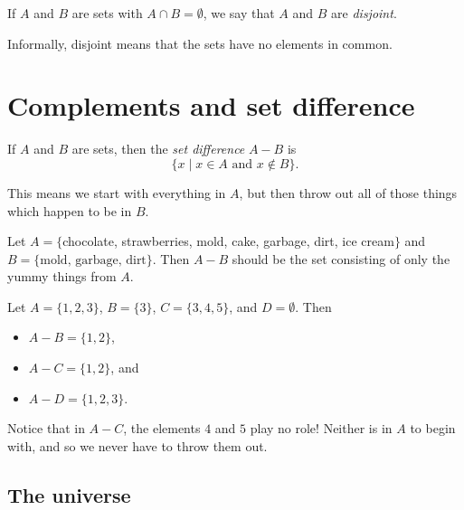 \documentclass{tufte-book}
\begin{document}
\begin{definition}
  If $A$ and $B$ are sets with $A \cap B = \emptyset$, we say that $A$ and $B$ are \emph{disjoint}.
\end{definition}
Informally, disjoint means that the sets have no elements in common.




\section{Complements and set difference}
\label{sec:compl-set-diff}

\begin{definition}
  If $A$ and $B$ are sets, then the \emph{set difference} $A - B$ is 
  \[
  \{x \mid x \in A \text{ and } x \notin B\}.
  \]
\end{definition}
This means we start with everything in $A$, but then throw out all of those things which happen to be in $B$.

\begin{example}
  Let $A = \{$chocolate, strawberries, mold, cake, garbage, dirt, ice cream$\}$ and $B = \{\text{mold, garbage, dirt}\}$. Then $A - B$ should be the set consisting of only the yummy things from $A$.
\end{example}

\begin{example}
  Let $A = \{1, 2, 3\}$, $B = \{3\}$, $C = \{3, 4, 5\}$, and $D = \emptyset$. Then
  \begin{itemize}
      \item $A - B = \{1, 2\}$,
      \item $A - C = \{1, 2\}$, and
      \item $A - D = \{1, 2, 3\}$.
  \end{itemize}
  Notice that in $A - C$, the elements $4$ and $5$ play no role! Neither is in $A$ to begin with, and so we never have to throw them out.
\end{example}

\subsection{The universe}
\label{sec:universe}
\end{document}
